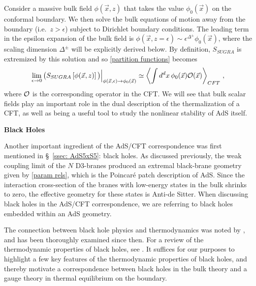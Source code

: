 \documentclass[../PhD.tex]{subfiles}
\begin{document}
Consider a massive bulk field $\phi(\vec x,z)$ that takes the value $\phi_0 (\vec x)$ on the conformal boundary. We then solve the bulk equations of motion away from the boundary (i.e.~$z > \epsilon$) subject to Dirichlet boundary conditions. The leading term in the epsilon expansion of the bulk field is $\phi(\vec x, z=\epsilon) \sim \epsilon^{\Delta^\pm} \phi_0(\vec x)$, where the scaling dimension $\Delta^\pm$ will be explicitly derived below. By definition, $S_{SUGRA}$ is extremized by this solution and so \eqref{partition functions} becomes \cite{hep-th/9802109, hep-th/9802150}
\begin{align}
\label{ads/cft duality}
\lim_{\epsilon \to 0} \big( S_{SUGRA} \left[ \phi(\vec x, z) \right] \big) \Big|_{\phi (\vec x, \epsilon) \to \phi_0(\vec x)} \simeq \left\langle \int d^dx \, \phi_0(\vec x) \mathcal O(\vec x) \right\rangle_{CFT} \, ,
\end{align}
where $\mathcal O$ is the corresponding operator in the CFT. We will see that bulk scalar fields play an important role in the dual description of the thermalization of a CFT, as well as being a useful tool to study the nonlinear stability of AdS itself. 

{\bf Black Holes}

Another important ingredient of the AdS/CFT correspondence was first mentioned in \S~\!\ref{ssec: AdS5xS5}: black holes. As discussed previously, the weak coupling limit of the $N$ D3-branes produced an extremal black-brane geometry given by \eqref{param rels}, which is the Poincar\'e patch description of AdS. Since the interaction cross-section of the branes with low-energy states in the bulk shrinks to zero, the effective geometry for these states is Anti-de Sitter. When discussing black holes in the AdS/CFT correspondence, we are referring to black holes embedded within an AdS geometry. 

The connection between black hole physics and thermodynamics was noted by \cite{Bekenstein:1973ur}, and has been thoroughly examined since then. For a review of the thermodynamic properties of black holes, see \cite{Jacobson1996, Bardeen:1973gs, 1803.03633}. It suffices for our purposes to highlight a few key features of the thermodynamic properties of black holes, and thereby motivate a correspondence between black holes in the bulk theory and a gauge theory in thermal equilibrium on the boundary.
\end{document}
